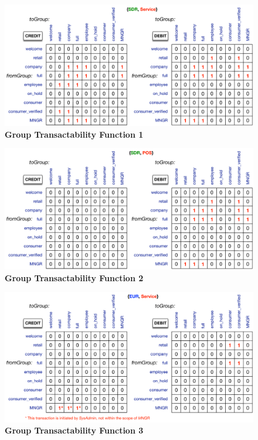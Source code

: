 \begin{figure}[h]
\vspace{-0.5cm}
\centering
\includegraphics[width=17.5cm]{Figures/GTF1}
\caption{\small\textbf{Group Transactability Function 1}}
\label{fig:GTF1}
\end{figure}

\begin{figure}[h]
\centering
\includegraphics[width=17.5cm]{Figures/GTF2}
\caption{\small\textbf{Group Transactability Function 2}}
\label{fig:GTF2}
\end{figure}

\begin{figure}[H]
\vspace{-0.5cm}
\centering
\includegraphics[width=17.5cm]{Figures/GTF3}
\caption{\small\textbf{Group Transactability Function 3}}
\label{fig:GTF3}
\end{figure}

